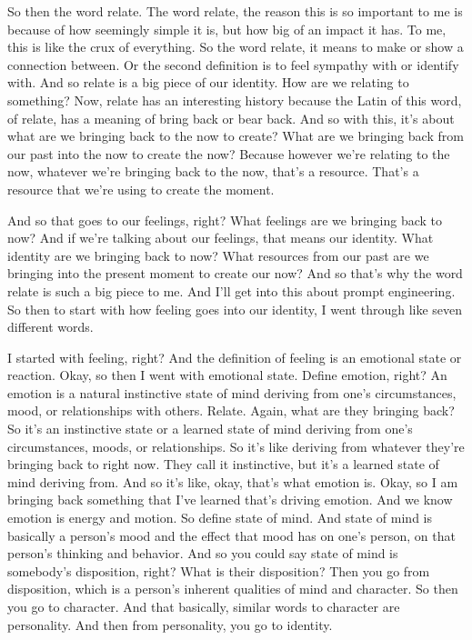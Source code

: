 \documentclass{article}
\begin{document}
\medskip

So then the word relate. The word relate, the reason this is so important to me is because
of how seemingly simple it is, but how big of an impact it has. To me, this is like the
crux of everything. So the word relate, it means to make or show a connection between.
Or the second definition is to feel sympathy with or identify with. And so relate is a big
piece of our identity. How are we relating to something? Now, relate has an interesting history
because the Latin of this word, of relate, has a meaning of bring back or bear back. And so
with this, it's about what are we bringing back to the now to create? What are we bringing back
from our past into the now to create the now? Because however we're relating to the now,
whatever we're bringing back to the now, that's a resource. That's a resource that we're using to
create the moment. 

\medskip

And so that goes to our feelings, right? What feelings are we bringing
back to now? And if we're talking about our feelings, that means our identity. What identity
are we bringing back to now? What resources from our past are we bringing into the present moment
to create our now? And so that's why the word relate is such a big piece to me. And I'll get
into this about prompt engineering. So then to start with how feeling goes into our identity,
I went through like seven different words. 

\medskip

I started with feeling, right? And the definition of feeling is an emotional state or reaction. Okay, so then I went with emotional state. Define emotion, right? An emotion is a natural instinctive state of mind deriving from one's circumstances, mood, or relationships with others. Relate. Again, what are they bringing back? So it's an instinctive state or a learned state of mind deriving from one's circumstances, moods, or relationships. So it's like deriving from whatever they're bringing back to right now. They call it instinctive, but it's a learned state of mind deriving from. And so it's like, okay, that's what emotion is. Okay, so I am bringing back something that I've learned that's driving emotion. And we know emotion is energy and motion. So define state of mind. And state of mind is basically a person's mood and the effect that mood has on one's person,
on that person's thinking and behavior. And so you could say state of mind is somebody's
disposition, right? What is their disposition? Then you go from disposition, which is a person's
inherent qualities of mind and character. So then you go to character. And that basically,
similar words to character are personality. And then from personality, you go to identity.
\end{document}
